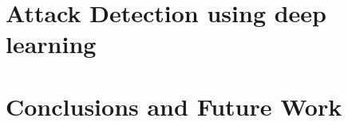 \documentclass[11pt]{book}
\begin{document}
\chapter{Attack Detection using deep learning}
\label{ch:Attack deep learning}


\chapter{Conclusions and Future Work}
\label{ch:conclude}







 
\end{document}
